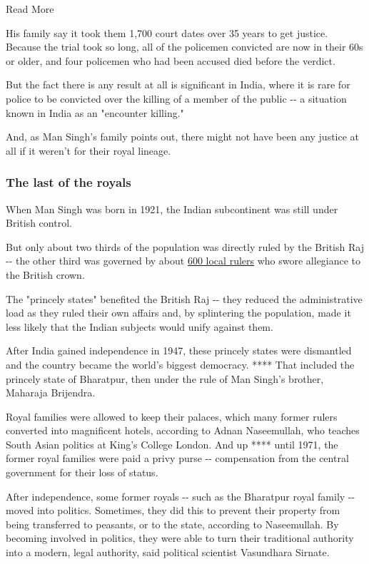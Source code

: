 Read More

His family say it took them 1,700 court dates over 35 years to get
justice. Because the trial took so long, all of the policemen convicted
are now in their 60s or older, and four policemen who had been accused
died before the verdict.

But the fact there is any result at all is significant in India, where
it is rare for police to be convicted over the killing of a member of
the public -\/- a situation known in India as an "encounter killing."

And, as Man Singh's family points out, there might not have been any
justice at all if it weren't for their royal lineage.

\hypertarget{the-last-of-the-royals}{%
\subsubsection{The last of the royals}\label{the-last-of-the-royals}}

When Man Singh was born in 1921, the Indian subcontinent was still under
British control.

But only about two thirds of the population was directly ruled by the
British Raj -\/- the other third was governed by about
\href{https://www.jstor.org/stable/4414671?read-now=1\&refreqid=excelsior\%3A5a3a0dddb2afd85267868bd5771e0e52\&seq=1\#page_scan_tab_contents}{600
local rulers} who swore allegiance to the British crown.

The "princely states" benefited the British Raj -\/- they reduced the
administrative load as they ruled their own affairs and, by splintering
the population, made it less likely that the Indian subjects would unify
against them.

After India gained independence in 1947, these princely states were
dismantled and the country became the world's biggest democracy. ****
That included the princely state of Bharatpur, then under the rule of
Man Singh's brother, Maharaja Brijendra.

Royal families were allowed to keep their palaces, which many former
rulers converted into magnificent hotels, according to Adnan
Naseemullah, who teaches South Asian politics at King's College London.
And up **** until 1971, the former royal families were paid a privy
purse -\/- compensation from the central government for their loss of
status.

After independence, some former royals -\/- such as the Bharatpur royal
family -\/- moved into politics. Sometimes, they did this to prevent
their property from being transferred to peasants, or to the state,
according to Naseemullah. By becoming involved in politics, they were
able to turn their traditional authority into a modern, legal authority,
said political scientist Vasundhara Sirnate.

